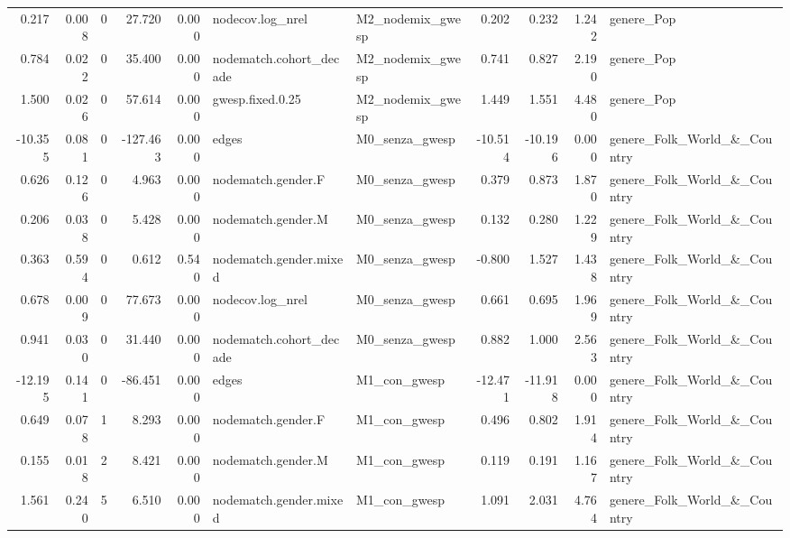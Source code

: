 \begin{table}
\begin{tabular}{rrrrrllrrrl}
    0.217 & 0.008 &        0 &   27.720 &     0.000 &        nodecov.log\_nrel & M2\_nodemix\_gwesp &   0.202 &   0.232 &   1.242 &                  genere\_Pop \\
    0.784 & 0.022 &        0 &   35.400 &     0.000 & nodematch.cohort\_decade & M2\_nodemix\_gwesp &   0.741 &   0.827 &   2.190 &                  genere\_Pop \\
    1.500 & 0.026 &        0 &   57.614 &     0.000 &        gwesp.fixed.0.25 & M2\_nodemix\_gwesp &   1.449 &   1.551 &   4.480 &                  genere\_Pop \\
  -10.355 & 0.081 &        0 & -127.463 &     0.000 &                   edges &   M0\_senza\_gwesp & -10.514 & -10.196 &   0.000 & genere\_Folk\_World\_\&\_Country \\
    0.626 & 0.126 &        0 &    4.963 &     0.000 &      nodematch.gender.F &   M0\_senza\_gwesp &   0.379 &   0.873 &   1.870 & genere\_Folk\_World\_\&\_Country \\
    0.206 & 0.038 &        0 &    5.428 &     0.000 &      nodematch.gender.M &   M0\_senza\_gwesp &   0.132 &   0.280 &   1.229 & genere\_Folk\_World\_\&\_Country \\
    0.363 & 0.594 &        0 &    0.612 &     0.540 &  nodematch.gender.mixed &   M0\_senza\_gwesp &  -0.800 &   1.527 &   1.438 & genere\_Folk\_World\_\&\_Country \\
    0.678 & 0.009 &        0 &   77.673 &     0.000 &        nodecov.log\_nrel &   M0\_senza\_gwesp &   0.661 &   0.695 &   1.969 & genere\_Folk\_World\_\&\_Country \\
    0.941 & 0.030 &        0 &   31.440 &     0.000 & nodematch.cohort\_decade &   M0\_senza\_gwesp &   0.882 &   1.000 &   2.563 & genere\_Folk\_World\_\&\_Country \\
  -12.195 & 0.141 &        0 &  -86.451 &     0.000 &                   edges &     M1\_con\_gwesp & -12.471 & -11.918 &   0.000 & genere\_Folk\_World\_\&\_Country \\
    0.649 & 0.078 &        1 &    8.293 &     0.000 &      nodematch.gender.F &     M1\_con\_gwesp &   0.496 &   0.802 &   1.914 & genere\_Folk\_World\_\&\_Country \\
    0.155 & 0.018 &        2 &    8.421 &     0.000 &      nodematch.gender.M &     M1\_con\_gwesp &   0.119 &   0.191 &   1.167 & genere\_Folk\_World\_\&\_Country \\
    1.561 & 0.240 &        5 &    6.510 &     0.000 &  nodematch.gender.mixed &     M1\_con\_gwesp &   1.091 &   2.031 &   4.764 & genere\_Folk\_World\_\&\_Country \\

\end{tabular}
\end{table}
